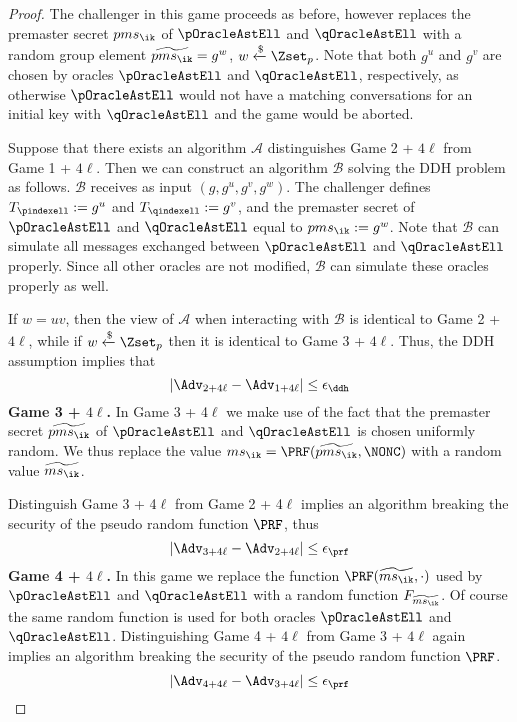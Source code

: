 \begin{proof}
 The challenger in this game proceeds as before, however replaces the premaster secret $pms_{\ik}$ of $\pOracleAstEll$ and $\qOracleAstEll$ with a random group element $\widetilde{pms_{\ik}} = g^w$, $w \xleftarrow{\$} \Zset_p$. Note that both $g^u$ and $g^v$ are chosen by oracles $\pOracleAstEll$ and $\qOracleAstEll$, respectively, as otherwise $\pOracleAstEll$ would not have a matching conversations for an initial key with $\qOracleAstEll$ and the game would be aborted.

 Suppose that there exists an algorithm $\mathcal{A}$ distinguishes Game 2 + $4\ell$ from Game 1 + $4\ell$. Then we can construct an algorithm $\mathcal{B}$ solving the DDH problem as follows. $\mathcal{B}$ receives as input $(g,g^u,g^v,g^w)$. The challenger defines $T_{\pindexell} := g^u$ and $T_{\qindexell} := g^v$, and the premaster secret of $\pOracleAstEll$ and $\qOracleAstEll$ equal to $pms_{\ik} := g^w$. Note that $\mathcal{B}$ can simulate all messages exchanged between $\pOracleAstEll$ and $\qOracleAstEll$ properly. Since all other oracles are not modified, $\mathcal{B}$ can simulate these oracles properly as well.

 If $w=uv$, then the view of $\mathcal{A}$ when interacting with $\mathcal{B}$ is identical to Game 2 + $4\ell$, while if $w \xleftarrow{\$}\Zset_p$ then it is identical to Game 3 + $4\ell$. Thus, the DDH assumption implies that
 \begin{equation}
  |\Adv_{2 + 4\ell} - \Adv_{1 + 4\ell}| \leq \epsilon_{\ddh}
 \end{equation}%
%
%
 \textbf{Game 3 + $4\ell$.} In Game 3 + 4$\ell$ we make use of the fact that the premaster secret $\widetilde{pms_{\ik}}$ of $\pOracleAstEll$ and $\qOracleAstEll$ is chosen uniformly random. We thus replace the value $ms_{\ik} = \PRF(\widetilde{pms_{\ik}}, \NONC)$ with a random value $\widetilde{ms_{\ik}}$.

 Distinguish Game 3 + 4$\ell$ from Game 2 + 4$\ell$ implies an algorithm breaking the security of the pseudo random function $\PRF$, thus
 \begin{equation}
  |\Adv_{3 + 4\ell} - \Adv_{2 + 4\ell}| \leq \epsilon_{\prf}
 \end{equation}%
%
%
 \textbf{Game 4 + $4\ell$.} In this game we replace the function $\PRF(\widetilde{ms_{\ik}}, \cdot)$ used by $\pOracleAstEll$ and $\qOracleAstEll$ with a random function $F_{\widetilde{ms_{\ik}}}$. Of course the same random function is used for both oracles $\pOracleAstEll$ and $\qOracleAstEll$. Distinguishing Game 4 + $4\ell$ from Game 3 + $4\ell$ again implies an algorithm breaking the security of the pseudo random function $\PRF$.
 \begin{equation}
  |\Adv_{4 + 4\ell} - \Adv_{3 + 4\ell}| \leq \epsilon_{\prf}
 \end{equation}%


\end{proof}
